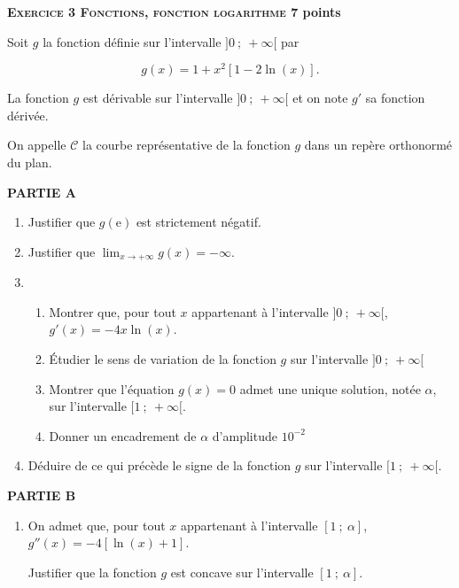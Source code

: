 \documentclass[10pt,a4paper]{article}
\begin{document}
\bigskip

\textbf{\textsc{Exercice 3 Fonctions, fonction logarithme} \hfill 7 points}

\medskip

Soit $g$ la fonction définie sur l'intervalle $]0~;~+\infty[$ par 

\[g(x) = 1+ x^2[1 - 2 \ln (x)].\]

La fonction $g$ est dérivable sur l'intervalle $]0~;~+\infty[$ et on note $g'$ sa fonction dérivée.

On appelle $\mathcal{C}$ la courbe représentative de la fonction $g$ dans un repère orthonormé du plan.

\medskip

\textbf{PARTIE A}

\medskip

\begin{enumerate}
\item Justifier que $g(\text{e})$ est strictement négatif.
\item Justifier que $\displaystyle\lim_{x \to + \infty} g(x) = - \infty$.
\item 
	\begin{enumerate}
		\item Montrer que, pour tout $x$ appartenant à l'intervalle $]0~;~+\infty[$,\: $g'(x) = -4x \ln (x)$.
		\item Étudier le sens de variation de la fonction $g$ sur l'intervalle $]0~;~+\infty[$ 
		\item Montrer que l'équation $g(x) = 0$ admet une unique solution, notée $\alpha$, sur l'intervalle $[1~;~+\infty[$.
		\item Donner un encadrement de $\alpha$ d'amplitude $10^{-2}$
	\end{enumerate}
\item Déduire de ce qui précède le signe de la fonction $g$ sur l'intervalle $[1~;~+\infty[$.
\end{enumerate}

\medskip

\textbf{PARTIE B}

\medskip

\begin{enumerate}
\item On admet que, pour tout $x$ appartenant à l'intervalle $[1~;~\alpha]$, $g''(x) = - 4[\ln (x) + 1]$.

Justifier que la fonction $g$ est concave sur l'intervalle $[1~;~\alpha]$.
\end{enumerate}
\end{document}
